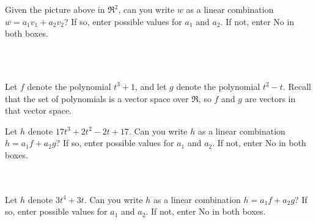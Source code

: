 \endedxproblem



\begin{center}
   
\end{center}

Given the picture above in $\Re^2$, 
can you write $w$ as a linear combination $w = a_1 v_1 + a_2 v_2$?  If so, enter possible values for $a_1$ and
$a_2$.  If not, enter No in both boxes.  

\\
\\


\edXsolution{ 
}

\endedxproblem



Let $f$ denote the polynomial $t^3  + 1$, and let $g$ denote the
polynomial $t^2 - t$.  Recall that the set of polynomials is a vector space over $\Re$, so $f$ and $g$
are vectors in that vector space.  

Let $h$ denote $17t^3 + 2t^2 - 2t + 17$.
Can you write $h$  as a linear combination $h = a_1 f + a_2 g$?  If so, enter possible values for $a_1$ and
$a_2$.  If not, enter No in both boxes.  

\\
\\


Let $h$ denote $3t^4 + 3t$.
Can you write $h$  as a linear combination $h = a_1 f + a_2 g$?  If so, enter possible values for $a_1$ and
$a_2$.  If not, enter No in both boxes.  

\\
\\


\edXsolution{ 
}




